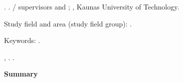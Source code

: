 \begin{titlepage}

\projectAuthorName. \projectTitle. \projectType / supervisors \projectSupervisorNameFirst and \projectSupervisorNameSecond; \projectFaculty, Kaunas University of Technology.

Study field and area (study field group): \projectStudyFieldAndArea.

Keywords: \projectKeywords.

\projectCity, \projectYear. \pageref{LastPage}.

\begin{center}
  \textbf{Summary}
\end{center}

\lipsum[2-3]

\end{titlepage}






















